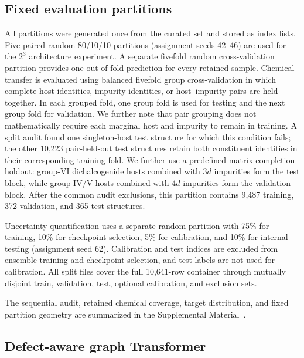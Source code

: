 \subsection{Fixed evaluation partitions}
\label{sec:splits}

All partitions were generated once from the curated set and stored as index
lists.  Five paired random 80/10/10 partitions (assignment seeds 42--46) are
used for the $2^3$ architecture experiment.  A separate fivefold random
cross-validation partition provides one out-of-fold prediction for every
retained sample.  Chemical transfer is evaluated using balanced fivefold
group cross-validation in which complete host identities, impurity identities,
or host--impurity pairs are held together.  In each grouped fold, one group
fold is used for testing and the next group fold for validation.  We further
note that pair grouping does not mathematically require each marginal host and
impurity to remain in training.  A split audit found one singleton-host test
structure for which this condition fails; the other 10,223 pair-held-out test
structures retain both constituent identities in their corresponding training
fold.  We further
use a predefined matrix-completion holdout: group-VI dichalcogenide hosts
combined with 3$d$ impurities form the test block, while group-IV/V hosts
combined with 4$d$ impurities form the validation block.  After the common
audit exclusions, this partition contains 9,487 training, 372 validation, and
365 test structures.

Uncertainty quantification uses a separate random partition with 75\% for
training, 10\% for checkpoint selection, 5\% for calibration, and 10\% for
internal testing (assignment seed 62).  Calibration and test indices are
excluded from ensemble training and checkpoint selection, and test labels are
not used for calibration.  All split files cover the full 10,641-row container
through mutually disjoint train, validation, test, optional calibration, and
exclusion sets.

The sequential audit, retained chemical coverage, target distribution, and
fixed partition geometry are summarized in the Supplemental
Material~\cite{supplemental}.

\subsection{Defect-aware graph Transformer}
\label{sec:architecture}


